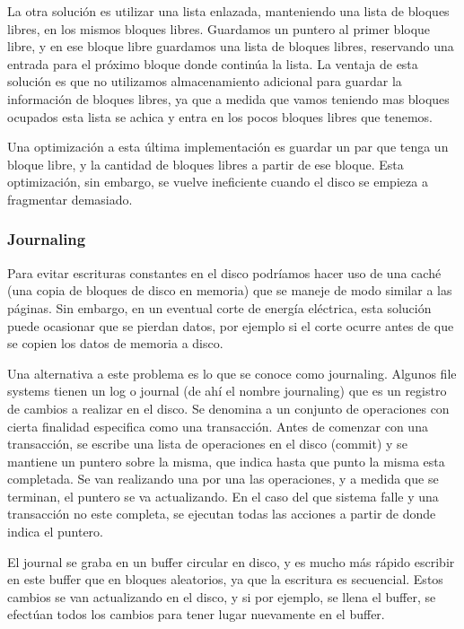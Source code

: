 \documentclass{article}
\begin{document}
La otra solución es utilizar una lista enlazada, manteniendo una lista de bloques libres, en los mismos bloques libres. Guardamos un puntero al primer bloque libre, y en ese bloque libre guardamos una lista de bloques libres, reservando una entrada para el pr\'oximo bloque donde contin\'ua la lista. La ventaja de esta solución es que no utilizamos almacenamiento adicional para guardar la información de bloques libres, ya que a medida que vamos teniendo mas bloques ocupados esta lista se achica y entra en los pocos bloques libres que tenemos.

Una optimizaci\'on a esta \'ultima implementaci\'on es guardar un par que tenga un bloque libre, y la cantidad de bloques libres a partir de ese bloque. Esta optimizaci\'on, sin embargo, se vuelve ineficiente cuando el disco se empieza a fragmentar demasiado.

\subsubsection{Journaling}

Para evitar escrituras constantes en el disco podríamos hacer uso de una cach\'e (una copia de bloques de disco en memoria) que se maneje de modo similar a las p\'aginas. Sin embargo, en un eventual corte de energ\'ia el\'ectrica, esta solución puede ocasionar que se pierdan datos, por ejemplo si el corte ocurre antes de que se copien los datos de memoria a disco.

Una alternativa a este problema es lo que se conoce como journaling. Algunos file systems tienen un log o journal (de ah\'i el nombre journaling) que es un registro de cambios a realizar en el disco. Se denomina a un conjunto de operaciones con cierta finalidad especifica como una transacción. Antes de comenzar con una transacción, se escribe una lista de operaciones en el disco (commit) y se mantiene un puntero sobre la misma, que indica hasta que punto la misma esta completada. Se van realizando una por una las operaciones, y a medida que se terminan, el puntero se va actualizando. En el caso del que sistema falle y una transacción no este completa, se ejecutan todas las acciones a partir de donde indica el puntero.

El journal se graba en un buffer circular en disco, y es mucho m\'as r\'apido escribir en este buffer que en bloques aleatorios, ya que la escritura es secuencial. Estos cambios se van actualizando en el disco, y si por ejemplo, se llena el buffer, se efectúan todos los cambios para tener lugar nuevamente en el buffer.
\end{document}
